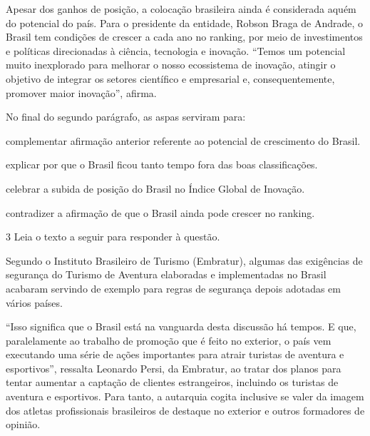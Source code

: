 {\begin{myquote}
Apesar dos ganhos de posição, a colocação brasileira ainda é considerada aquém 
do potencial do país. Para o presidente da entidade, Robson Braga de Andrade, 
o Brasil tem condições de crescer a cada ano no ranking, por meio de investimentos 
e políticas direcionadas à ciência, tecnologia e inovação. ``Temos um potencial muito
inexplorado para melhorar o nosso ecossistema de inovação, atingir o objetivo de 
integrar os setores científico e empresarial e, consequentemente, promover maior 
inovação'', afirma.

\end{myquote}


No final do segundo parágrafo, as aspas serviram para:

\begin{escolha}

  \item complementar afirmação anterior referente ao potencial de crescimento do Brasil.

  \item explicar por que o Brasil ficou tanto tempo fora das boas classificações.

  \item celebrar a subida de posição do Brasil no Índice Global de Inovação.

  \item contradizer a afirmação de que o Brasil ainda pode crescer no ranking.

\end{escolha}


\num{3} Leia o texto a seguir para responder à questão. 

Segundo o Instituto Brasileiro de Turismo (Embratur), algumas das exigências de
segurança do Turismo de Aventura elaboradas e implementadas no Brasil acabaram 
servindo de exemplo para regras de segurança depois adotadas em vários países.

``Isso significa que o Brasil está na vanguarda desta discussão há tempos. E
que, paralelamente ao trabalho de promoção que é feito no exterior, o país vem
executando uma série de ações importantes para atrair turistas de aventura e
esportivos'', ressalta Leonardo Persi, da Embratur, ao tratar dos planos para tentar
aumentar a captação de clientes estrangeiros, incluindo os turistas de
aventura e esportivos. Para tanto, a autarquia cogita inclusive se valer da
imagem dos atletas profissionais brasileiros de destaque no exterior e outros
formadores de opinião.

}
